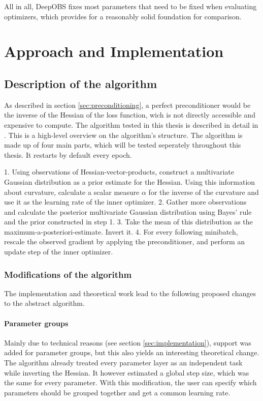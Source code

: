 \documentclass[twoside,12pt,a4paper]{report}
\begin{document}
All in all, DeepOBS fixes most parameters that need to be fixed when evaluating optimizers, which provides for a reasonably solid foundation for comparison.



\chapter{Approach and Implementation}
\section{Description of the algorithm}
As described in section \ref{sec:preconditioning}, a perfect preconditioner would be the inverse of the Hessian of the loss function, wich is not directly accessible and expensive to compute.
The algorithm tested in this thesis is described in detail in \cite{roos2019active}.
This is a high-level overview on the algorithm's structure.
The algorithm is made up of four main parts, which will be tested seperately throughout this thesis.
It restarts by default every epoch.
\begin{markdown}
1. Using observations of Hessian-vector-products, construct a multivariate Gaussian distribution as a prior estimate for the Hessian. Using this information about curvature, calculate a scalar measure $\alpha$ for the inverse of the curvature and use it as the learning rate of the inner optimizer.
2. Gather more observations and calculate the posterior multivariate Gaussian distribution using Bayes' rule and the prior constructed in step 1.
3. Take the mean of this distribution as the maximum-a-posteriori-estimate. Invert it.
4. For every following minibatch, rescale the observed gradient by applying the preconditioner, and perform an update step of the inner optimizer.
\end{markdown}


\subsection{Modifications of the algorithm}
The implementation and theoretical work lead to the following proposed changes to the abstract algorithm.

\subsubsection{Parameter groups}
Mainly due to technical reasons (see section \ref{sec:implementation}), support was added for parameter groups, but this also yields an interesting theoretical change. The algorithm already treated every parameter layer as an independent task while inverting the Hessian. It however estimated a global step size, which was the same for every parameter. With this modification, the user can specify which parameters should be grouped together and get a common learning rate.
\end{document}
